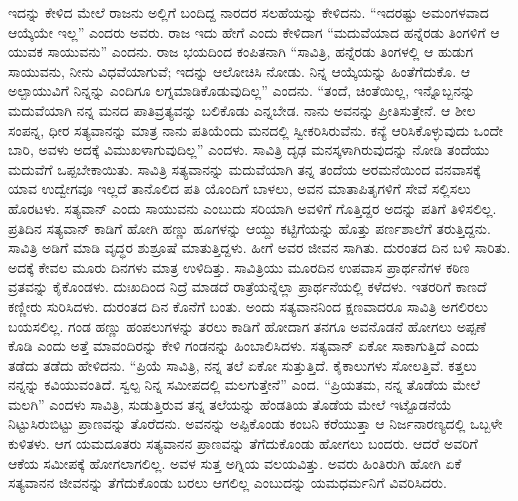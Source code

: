 ಇದನ್ನು ಕೇಳಿದ ಮೇಲೆ ರಾಜನು ಅಲ್ಲಿಗೆ ಬಂದಿದ್ದ ನಾರದರ ಸಲಹೆಯನ್ನು ಕೇಳಿದನು. “ಇದರಷ್ಟು ಅಮಂಗಳವಾದ ಆಯ್ಕೆಯೇ ಇಲ್ಲ” ಎಂದರು ಅವರು. ರಾಜ ಇದು ಹೇಗೆ ಎಂದು ಕೇಳಿದಾಗ “ಮದುವೆಯಾದ ಹನ್ನೆರಡು ತಿಂಗಳಿಗೆ ಆ ಯುವಕ ಸಾಯುವನು” ಎಂದನು. ರಾಜ ಭಯದಿಂದ ಕಂಪಿತನಾಗಿ “ಸಾವಿತ್ರಿ, ಹನ್ನೆರಡು ತಿಂಗಳಲ್ಲಿ ಆ ಹುಡುಗ ಸಾಯುವನು, ನೀನು ವಿಧವೆಯಾಗುವೆ; ಇದನ್ನು ಆಲೋಚಿಸಿ ನೋಡು. ನಿನ್ನ ಆಯ್ಕೆಯನ್ನು ಹಿಂತೆಗೆದುಕೊ. ಆ ಅಲ್ಪಾಯುವಿಗೆ ನಿನ್ನನ್ನು ಎಂದಿಗೂ ಲಗ್ನಮಾಡಿಕೊಡುವುದಿಲ್ಲ” ಎಂದನು. “ತಂದೆ, ಚಿಂತೆಯಿಲ್ಲ, ಇನ್ನೊಬ್ಬನನ್ನು ಮದುವೆಯಾಗಿ ನನ್ನ ಮನದ ಪಾತಿವ್ರತ್ಯವನ್ನು ಬಲಿಕೊಡು ಎನ್ನಬೇಡ. ನಾನು ಅವನನ್ನು ಪ್ರೀತಿಸುತ್ತೇನೆ. ಆ ಶೀಲ ಸಂಪನ್ನ, ಧೀರ ಸತ್ಯವಾನನ್ನು ಮಾತ್ರ ನಾನು ಪತಿಯೆಂದು ಮನದಲ್ಲಿ ಸ್ವೀಕರಿಸಿರುವೆನು. ಕನ್ಯೆ ಆರಿಸಿಕೊಳ್ಳುವುದು ಒಂದೇ ಬಾರಿ, ಅವಳು ಅದಕ್ಕೆ ವಿಮುಖಳಾಗುವುದಿಲ್ಲ” ಎಂದಳು. ಸಾವಿತ್ರಿ ದೃಢ ಮನಸ್ಕಳಾಗಿರುವುದನ್ನು ನೋಡಿ ತಂದೆಯು ಮದುವೆಗೆ ಒಪ್ಪಬೇಕಾಯಿತು. ಸಾವಿತ್ರಿ ಸತ್ಯವಾನನ್ನು ಮದುವೆಯಾಗಿ ತನ್ನ ತಂದೆಯ ಅರಮನೆಯಿಂದ ವನವಾಸಕ್ಕೆ ಯಾವ ಉದ್ವೇಗವೂ ಇಲ್ಲದೆ ತಾನೊಲಿದ ಪತಿ ಯೊಂದಿಗೆ ಬಾಳಲು, ಅವನ ಮಾತಾಪಿತೃಗಳಿಗೆ ಸೇವೆ ಸಲ್ಲಿಸಲು ಹೊರಟಳು. ಸತ್ಯವಾನ್​ ಎಂದು ಸಾಯುವನು ಎಂಬುದು ಸರಿಯಾಗಿ ಅವಳಿಗೆ ಗೊತ್ತಿದ್ದರ ಅದನ್ನು ಪತಿಗೆ ತಿಳಿಸಲಿಲ್ಲ. ಪ್ರತಿದಿನ ಸತ್ಯವಾನ್​ ಕಾಡಿಗೆ ಹೋಗಿ ಹಣ್ಣು ಹೂಗಳನ್ನು ಆಯ್ದು ಕಟ್ಟಿಗೆಯನ್ನು ಹೊತ್ತು ಪರ್ಣಶಾಲೆಗೆ ತರುತ್ತಿದ್ದನು. ಸಾವಿತ್ರಿ ಅಡಿಗೆ ಮಾಡಿ ವೃದ್ಧರ ಶುಶ್ರೂಷೆ ಮಾತುತ್ತಿದ್ದಳು. ಹೀಗೆ ಅವರ ಜೀವನ ಸಾಗಿತು. ದುರಂತದ ದಿನ ಬಳಿ ಸಾರಿತು. ಅದಕ್ಕೆ ಕೇವಲ ಮೂರು ದಿನಗಳು ಮಾತ್ರ ಉಳಿದಿತ್ತು. ಸಾವಿತ್ರಿಯು ಮೂರದಿನ ಉಪವಾಸ ಪ್ರಾರ್ಥನೆಗಳ ಕಠಿಣ ವ್ರತವನ್ನು ಕೈಕೊಂಡಳು. ದುಃಖದಿಂದ ನಿದ್ರೆ ಮಾಡದೆ ರಾತ್ರೆಯನ್ನೆಲ್ಲಾ ಪ್ರಾರ್ಥನೆಯಲ್ಲಿ ಕಳೆದಳು. ಇತರರಿಗೆ ಕಾಣದೆ ಕಣ್ಣೀರು ಸುರಿಸಿದಳು. ದುರಂತದ ದಿನ ಕೊನೆಗೆ ಬಂತು. ಅಂದು ಸತ್ಯವಾನನಿಂದ ಕ್ಷಣವಾದರೂ ಸಾವಿತ್ರಿ ಅಗಲಿರಲು ಬಯಸಲಿಲ್ಲ. ಗಂಡ ಹಣ್ಣು ಹಂಪಲುಗಳನ್ನು ತರಲು ಕಾಡಿಗೆ ಹೋದಾಗ ತನಗೂ ಅವನೊಡನೆ ಹೋಗಲು ಅಪ್ಪಣೆ ಕೊಡಿ ಎಂದು ಅತ್ತೆ ಮಾವಂದಿರನ್ನು ಕೇಳಿ ಗಂಡನನ್ನು ಹಿಂಬಾಲಿಸಿದಳು. ಸತ್ಯವಾನ್​ ಏಕೋ ಸಾಕಾಗುತ್ತಿದೆ ಎಂದು ತಡೆದು ತಡೆದು ಹೇಳಿದನು. “ಪ್ರಿಯೆ ಸಾವಿತ್ರಿ, ನನ್ನ ತಲೆ ಏಕೋ ಸುತ್ತುತ್ತಿದೆ. ಕೈಕಾಲುಗಳು ಸೋಲತ್ತಿವೆ. ಕತ್ತಲು ನನ್ನನ್ನು ಕವಿಯುವಂತಿದೆ. ಸ್ವಲ್ಪ ನಿನ್ನ ಸಮೀಪದಲ್ಲಿ ಮಲಗುತ್ತೇನೆ” ಎಂದ. “ಪ್ರಿಯತಮ, ನನ್ನ ತೊಡೆಯ ಮೇಲೆ ಮಲಗಿ” ಎಂದಳು ಸಾವಿತ್ರಿ, ಸುಡುತ್ತಿರುವ ತನ್ನ ತಲೆಯನ್ನು ಹೆಂಡತಿಯ ತೊಡೆಯ ಮೇಲೆ ಇಟ್ಟೊಡನೆಯೆ ನಿಟ್ಟುಸಿರುಬಿಟ್ಟು ಪ್ರಾಣವನ್ನು ತೊರೆದನು. ಅವನನ್ನು ಅಪ್ಪಿಕೊಂಡು ಕಂಬನಿ ಕರೆಯುತ್ತಾ ಆ ನಿರ್ಜನಾರಣ್ಯದಲ್ಲಿ ಒಬ್ಬಳೇ ಕುಳಿತಳು. ಆಗ ಯಮದೂತರು ಸತ್ಯವಾನನ ಪ್ರಾಣವನ್ನು ತೆಗೆದುಕೊಂಡು ಹೋಗಲು ಬಂದರು. ಆದರೆ ಅವರಿಗೆ ಆಕೆಯ ಸಮೀಪಕ್ಕೆ ಹೋಗಲಾಗಲಿಲ್ಲ. ಅವಳ ಸುತ್ತ ಅಗ್ನಿಯ ವಲಯವಿತ್ತು. ಅವರು ಹಿಂತಿರುಗಿ ಹೋಗಿ ಏಕೆ ಸತ್ಯವಾನನ ಜೀವನನ್ನು ತೆಗೆದುಕೊಂಡು ಬರಲು ಆಗಲಿಲ್ಲ ಎಂಬುದನ್ನು ಯಮಧರ್ಮನಿಗೆ ವಿವರಿಸಿದರು.

